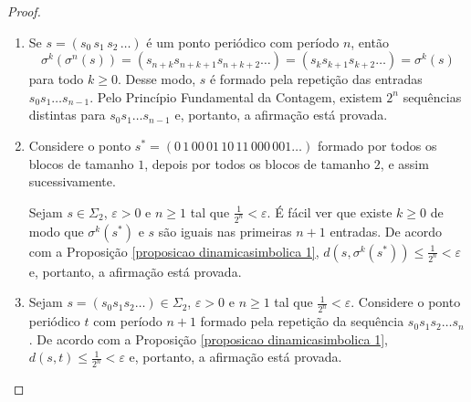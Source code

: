 \begin{proof}
\begin{enumerate}
\item Se $s = (s_0\, s_1\, s_2\, \dots)$ é um ponto periódico com período $n$, então
$$\sigma^k(\sigma^n(s)) = (s_{n+k}s_{n+k+1}s_{n+k+2}\dots) = (s_ks_{k+1}s_{k+2}\dots) = \sigma^k(s)$$
para todo $k \geq 0$. Desse modo, $s$ é formado pela repetição das entradas $s_0 s_1 \dots s_{n-1}$. Pelo Princípio Fundamental da Contagem, existem $2^n$ sequências distintas para  $s_0 s_1 \dots s_{n-1}$ e, portanto, a afirmação está provada.

\item Considere o ponto $s^* = (0 \, 1 \, 0 0 \, 0 1 \, 1 0 \, 1 1 \, 0 0 0 \, 0 0 1 \dots)$ formado por todos os blocos de tamanho $1$, depois por todos os blocos de tamanho $2$, e assim sucessivamente. 

Sejam $s \in \Sigma_2$, $\varepsilon > 0$ e $n \geq 1$ tal que $\frac{1}{2^n} < \varepsilon$. É fácil ver que existe $k \geq 0$ de modo que $\sigma^k(s^*)$ e $s$ são iguais nas primeiras $n+1$ entradas. De acordo com a Proposição \ref{proposicao dinamicasimbolica 1}, $d(s, \sigma^k(s^*)) \leq \frac{1}{2^n} < \varepsilon$ e, portanto, a afirmação está provada.

\item Sejam $s = (s_0 s_1 s_2 \dots) \in \Sigma_2$, $\varepsilon > 0$ e $n \geq 1$ tal que $\frac{1}{2^n} < \varepsilon$. Considere o ponto periódico $t$ com período $n+1$ formado pela repetição da sequência $s_0 s_1 s_2 \dots s_n$. De acordo com a Proposição \ref{proposicao dinamicasimbolica 1}, $d(s, t) \leq \frac{1}{2^n} < \varepsilon$ e, portanto, a afirmação está provada.
\end{enumerate}
\end{proof}
